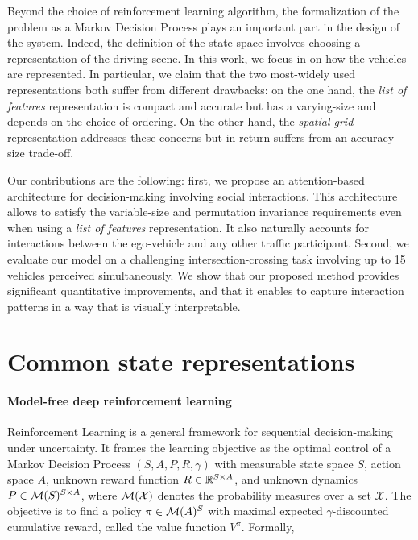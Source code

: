 Beyond the choice of reinforcement learning algorithm, the formalization of the problem as a Markov Decision Process plays an important part in the design of the system. Indeed, the definition of the state space involves choosing a representation of the driving scene. In this work, we focus in on how the vehicles are represented. In particular, we claim that the two most-widely used representations both suffer from different drawbacks: on the one hand, the \emph{list of features} representation is compact and accurate but has a varying-size and depends on the choice of ordering. On the other hand, the \emph{spatial grid} representation addresses these concerns but in return suffers from an accuracy-size trade-off.

Our contributions are the following: first, we propose an attention-based architecture for decision-making involving social interactions. This architecture allows to satisfy the variable-size and permutation invariance requirements even when using a \emph{list of features} representation. It also naturally accounts for interactions between the ego-vehicle and any other traffic participant.
Second, we evaluate our model on a challenging intersection-crossing task involving up to 15 vehicles perceived simultaneously. We show that our proposed method provides significant quantitative improvements, and that it enables to capture interaction patterns in a way that is visually interpretable.

\section{Common state representations}

\label{sec:background}

\paragraph{Model-free deep reinforcement learning} Reinforcement Learning is a general framework for sequential decision-making under uncertainty. It frames the learning objective as the optimal control of a Markov Decision Process $(S, A, P, R, \gamma)$ with measurable state space $S$, action space $A$, unknown reward function $R\in\mathbb{R}^{S \times A}$, and unknown dynamics $P\in \mathcal{M}(S)^{S \times A}$, where $\mathcal{M}(\mathcal{X})$ denotes the probability measures over a set $\mathcal{X}$. The objective is to find a policy $\pi\in\mathcal{M}(A)^S$ with maximal expected $\gamma$-discounted cumulative reward, called the value function $V^\pi$. Formally,

